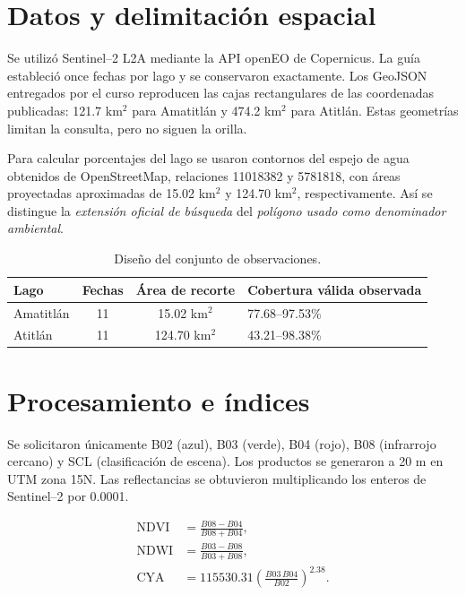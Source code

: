 \documentclass[11pt,letterpaper]{article}
\begin{document}
\section{Datos y delimitación espacial}

Se utilizó Sentinel--2 L2A mediante la API openEO de Copernicus. La guía estableció once fechas por lago y se conservaron exactamente. Los GeoJSON entregados por el curso reproducen las cajas rectangulares de las coordenadas publicadas: 121.7 km$^2$ para Amatitlán y 474.2 km$^2$ para Atitlán. Estas geometrías limitan la consulta, pero no siguen la orilla.

Para calcular porcentajes del lago se usaron contornos del espejo de agua obtenidos de OpenStreetMap, relaciones 11018382 y 5781818, con áreas proyectadas aproximadas de 15.02 km$^2$ y 124.70 km$^2$, respectivamente. Así se distingue la \emph{extensión oficial de búsqueda} del \emph{polígono usado como denominador ambiental}.

\begin{table}[H]
\centering
\caption{Diseño del conjunto de observaciones.}
\begin{tabularx}{\textwidth}{lccX}
\toprule
\textbf{Lago} & \textbf{Fechas} & \textbf{Área de recorte} & \textbf{Cobertura válida observada} \\
\midrule
Amatitlán & 11 & 15.02 km$^2$ & 77.68--97.53\% \\
Atitlán & 11 & 124.70 km$^2$ & 43.21--98.38\% \\
\bottomrule
\end{tabularx}
\end{table}

\section{Procesamiento e índices}

Se solicitaron únicamente B02 (azul), B03 (verde), B04 (rojo), B08 (infrarrojo cercano) y SCL (clasificación de escena). Los productos se generaron a 20 m en UTM zona 15N. Las reflectancias se obtuvieron multiplicando los enteros de Sentinel--2 por 0.0001.

\begin{align}
\mathrm{NDVI} &= \frac{B08-B04}{B08+B04}, \\
\mathrm{NDWI} &= \frac{B03-B08}{B03+B08}, \\
\mathrm{CYA} &= 115530.31\left(\frac{B03\,B04}{B02}\right)^{2.38}.
\end{align}
\end{document}
